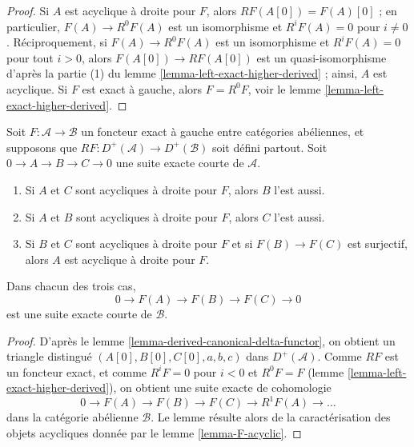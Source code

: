 \begin{proof}
Si $A$ est acyclique à droite pour $F$, alors
$RF(A[0]) = F(A)[0]$ ; en particulier, $F(A) \to R^0F(A)$ est un isomorphisme
et $R^iF(A) = 0$ pour $i \not = 0$. Réciproquement, si
$F(A) \to R^0F(A)$ est un isomorphisme et $R^iF(A) = 0$ pour tout $i > 0$,
alors $F(A[0]) \to RF(A[0])$ est un quasi-isomorphisme d'après la partie (1)
du lemme \ref{lemma-left-exact-higher-derived} ; ainsi, $A$ est acyclique.
Si $F$ est exact à gauche, alors $F = R^0F$, voir le
lemme \ref{lemma-left-exact-higher-derived}.
\end{proof}

\begin{lemma}
\label{lemma-F-acyclic-ses}
Soit $F : \mathcal{A} \to \mathcal{B}$ un foncteur exact à gauche entre
catégories abéliennes, et supposons que
$RF : D^{+}(\mathcal{A}) \to D^{+}(\mathcal{B})$ soit défini partout. Soit
$0 \to A \to B \to C \to 0$ une suite exacte courte de $\mathcal{A}$.
\begin{enumerate}
\item Si $A$ et $C$ sont acycliques à droite pour $F$, alors $B$ l'est aussi.
\item Si $A$ et $B$ sont acycliques à droite pour $F$, alors $C$ l'est aussi.
\item Si $B$ et $C$ sont acycliques à droite pour $F$ et si
$F(B) \to F(C)$ est surjectif, alors $A$ est acyclique à droite pour $F$.
\end{enumerate}
Dans chacun des trois cas,
$$
0 \to F(A) \to F(B) \to F(C) \to 0
$$
est une suite exacte courte de $\mathcal{B}$.
\end{lemma}

\begin{proof}
D'après le lemme \ref{lemma-derived-canonical-delta-functor}, on obtient un
triangle distingué $(A[0], B[0], C[0], a, b, c)$ dans
$D^{+}(\mathcal{A})$. Comme $RF$ est un foncteur exact, et comme
$R^iF = 0$ pour $i < 0$ et $R^0F = F$
(lemme \ref{lemma-left-exact-higher-derived}), on obtient une suite exacte de
cohomologie
$$
0 \to F(A) \to F(B) \to F(C) \to R^1F(A) \to \ldots
$$
dans la catégorie abélienne $\mathcal{B}$. Le lemme résulte alors de la
caractérisation des objets acycliques donnée par
le lemme \ref{lemma-F-acyclic}.
\end{proof}

